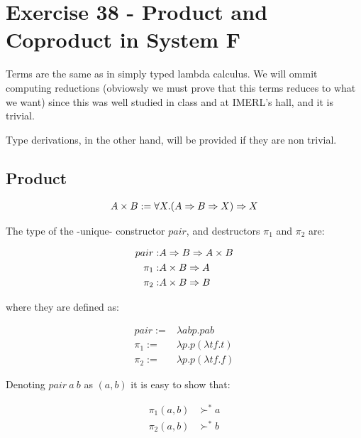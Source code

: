 \section{Exercise 38 - Product and Coproduct in System F}


Terms are the same as in simply typed lambda calculus.
We will ommit computing reductions (obviowsly we must prove that
this terms reduces to what we want) since this was
well studied in class and at IMERL's hall, and it is trivial.

Type derivations, in the other hand, will be provided if they are
non trivial.


\subsection*{Product}

\begin{align}
  A \times B := \forall X. (A\Rightarrow B\Rightarrow X) \Rightarrow X \nonumber
\end{align}
  
  The type of the -unique- constructor $pair$, and destructors $\pi_1$ and
  $\pi_2$ are:

\begin{align}
  pair  :& A \Rightarrow B \Rightarrow A\times B  \nonumber \\
  \pi_1 :& A \times B \Rightarrow A        \nonumber \\
  \pi_2 :& A \times B \Rightarrow B        \nonumber
\end{align}
  
  where they are defined as:

\begin{align}
  pair :=& \lambda a b p . p a b        \nonumber \\
  \pi_1:=& \lambda p. p (\lambda t f.t) \nonumber \\
  \pi_2:=& \lambda p. p (\lambda t f.f) \nonumber
\end{align}

Denoting $pair\ a\ b$ as $(a,b)$ it is easy to show that:

\begin{align*}
  \pi_1 (a,b) &\succ^{*} a \\
  \pi_2 (a,b) &\succ^{*} b
\end{align*}

